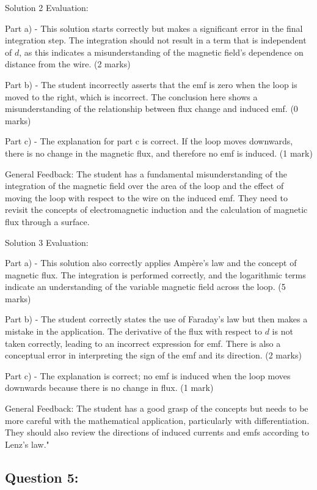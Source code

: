 \documentclass[a4paper,11pt]{article}
\begin{document}
Solution 2 Evaluation:

Part a) - This solution starts correctly but makes a significant error in the final integration step. The integration should not result in a term that is independent of \( d \), as this indicates a misunderstanding of the magnetic field's dependence on distance from the wire. (2 marks)

Part b) - The student incorrectly asserts that the emf is zero when the loop is moved to the right, which is incorrect. The conclusion here shows a misunderstanding of the relationship between flux change and induced emf. (0 marks)

Part c) - The explanation for part c is correct. If the loop moves downwards, there is no change in the magnetic flux, and therefore no emf is induced. (1 mark)

General Feedback: The student has a fundamental misunderstanding of the integration of the magnetic field over the area of the loop and the effect of moving the loop with respect to the wire on the induced emf. They need to revisit the concepts of electromagnetic induction and the calculation of magnetic flux through a surface.

Solution 3 Evaluation:

Part a) - This solution also correctly applies Ampère's law and the concept of magnetic flux. The integration is performed correctly, and the logarithmic terms indicate an understanding of the variable magnetic field across the loop. (5 marks)

Part b) - The student correctly states the use of Faraday's law but then makes a mistake in the application. The derivative of the flux with respect to \( d \) is not taken correctly, leading to an incorrect expression for emf. There is also a conceptual error in interpreting the sign of the emf and its direction. (2 marks)

Part c) - The explanation is correct; no emf is induced when the loop moves downwards because there is no change in flux. (1 mark)

General Feedback: The student has a good grasp of the concepts but needs to be more careful with the mathematical application, particularly with differentiation. They should also review the directions of induced currents and emfs according to Lenz's law."

\subsection*{Question 5:}
\end{document}
